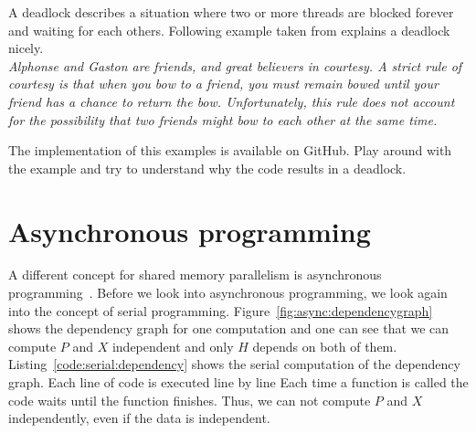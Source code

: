 \documentclass[11pt,fleqn]{book} %
\begin{document}
A deadlock describes a situation where two or more threads are blocked forever and waiting for each others. Following example taken from explains a deadlock nicely. \\

\textit{Alphonse and Gaston are friends, and great believers in courtesy. A strict rule of courtesy is that when you bow to a friend, you must remain bowed until your friend has a chance to return the bow. Unfortunately, this rule does not account for the possibility that two friends might bow to each other at the same time.}

\begin{exercise}
The implementation of this examples is available on GitHub. Play around with the example and try to understand why the code results in a deadlock. 
\end{exercise}

\chapter{Asynchronous programming}
\label{sec:async:coding}
A different concept for shared memory parallelism is asynchronous programming~\cite{williams2012c++}. Before we look into asynchronous programming, we look again into the concept of serial programming. Figure~\ref{fig:async:dependencygraph} shows the dependency graph for one computation and one can see that we can compute $P$ and $X$ independent and only $H$ depends on both of them. Listing~\ref{code:serial:dependency} shows the serial computation of the dependency graph. Each line of code is executed line by line Each time a function is called the code waits until the function finishes. Thus, we can not compute $P$ and $X$ independently, even if the data is independent. 
\end{document}

